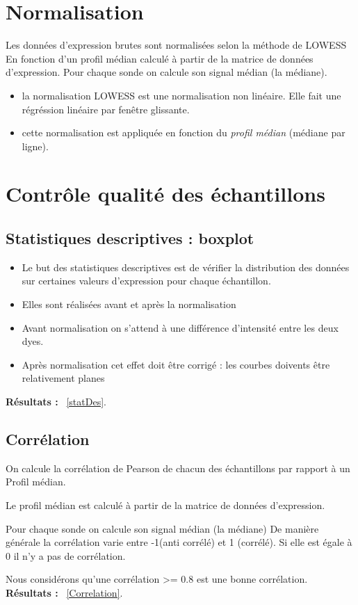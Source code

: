 \documentclass[a4paper]{article}
\begin{document}
\section*{Normalisation}
Les données d'expression brutes sont normalisées selon la méthode de LOWESS 
En fonction d'un profil médian calculé à partir de la matrice de données d'expression. Pour chaque sonde on calcule son signal médian (la médiane).
\begin{itemize}
\item la normalisation LOWESS est une normalisation non linéaire. Elle fait une régréssion linéaire par fenêtre glissante.
\item cette normalisation est appliquée en fonction du \emph{profil médian} (médiane par ligne).
\end{itemize}


\section*{Contrôle qualité des échantillons}
\subsection*{Statistiques descriptives : boxplot}
\begin{itemize}
\item Le but des statistiques descriptives est de vérifier la distribution des données sur certaines valeurs d'expression pour chaque échantillon.
\item Elles sont réalisées avant et après la normalisation
\item Avant normalisation on s'attend à une différence d'intensité entre les deux dyes.
\item Après normalisation cet effet doit être corrigé : les courbes doivents être relativement planes
\end{itemize}


\textbf{Résultats :} ~\ref{statDes}.

\subsection*{Corrélation}
On calcule la corrélation de Pearson de chacun des échantillons par rapport à un Profil médian.
\par
Le profil médian est calculé à partir de la matrice de données d'expression. 
\par
Pour chaque sonde on calcule son signal médian (la médiane)
%
De manière générale la corrélation varie entre -1(anti corrélé) et 1 (corrélé).
Si elle est égale à 0 il n'y a pas de corrélation.
\par
Nous considérons qu'une corrélation >= 0.8 est une bonne corrélation.
\\
\textbf{Résultats :} ~\ref{Correlation}.

\end{document}
